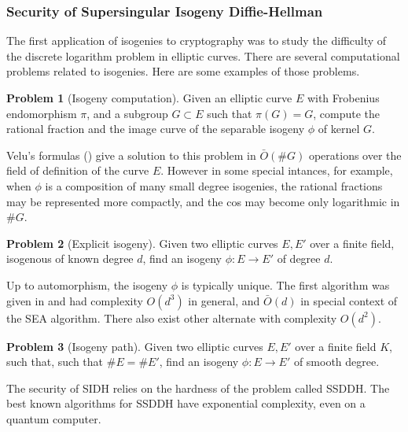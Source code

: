\documentclass{article}
\theoremstyle{theorem}
\theoremstyle{definition}
\newtheorem{problem}{Problem}
\begin{document}
\subsubsection{Security of Supersingular Isogeny Diffie-Hellman}

The first application of isogenies to cryptography was to study  the difficulty of the discrete logarithm problem in elliptic curves. There are several computational problems related to isogenies. Here are some examples of those problems.

\begin{problem}[Isogeny computation]
	Given an elliptic curve $E$ with Frobenius endomorphism  $\pi$, and a subgroup $G \subset E$ such that $\pi(G) = G$, compute the rational fraction and the image curve of the separable isogeny $\phi$ of kernel $G$.
\end{problem}

Velu's formulas (\cite[Proposition 38]{IsogenyCryptoDeFeo}) give a solution to this problem in $\bar{O}(\#G)$ operations over the field of definition of the curve $E$. However in some special intances, for example, when $\phi$ is a composition of many small degree isogenies, the rational fractions may be represented more compactly, and the cos may become only logarithmic in $\#G$.

\begin{problem}[Explicit isogeny]
	Given two elliptic curves $E, E'$ over a finite field, isogenous of known degree $d$, find an isogeny $\phi: E \to E'$ of degree $d$.
\end{problem}

Up to automorphism, the isogeny $\phi$ is typically unique. The first algorithm was given in \cite{Elkies98} and had complexity $O(d^3)$ in general, and $\bar{O}(d)$ in special context  of the SEA algorithm. There also exist other alternate with complexity $O(d^2)$.

\begin{problem}[Isogeny path]
	Given two elliptic curves $E, E'$ over a finite field $K$, such that, such that $\#E = \#E'$, find an isogeny $\phi: E \to E'$ of smooth degree.
\end{problem}

The security of SIDH relies on the hardness of the problem called SSDDH. The best known algorithms for SSDDH have exponential complexity, even on a quantum computer.
\end{document}
